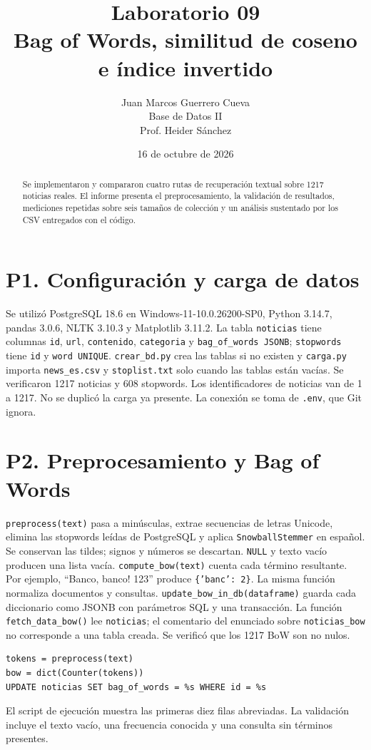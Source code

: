 \documentclass[11pt,a4paper]{article}
\title{Laboratorio 09\\Bag of Words, similitud de coseno e índice invertido}
\author{Juan Marcos Guerrero Cueva\\Base de Datos II\\Prof. Heider Sánchez}
\date{16 de octubre de 2026}
\newcommand{\codigo}[1]{\texttt{#1}}
\begin{document}
\maketitle
\begin{abstract}
Se implementaron y compararon cuatro rutas de recuperación textual sobre 1217
noticias reales. El informe presenta el preprocesamiento, la validación de resultados,
mediciones repetidas sobre seis tamaños de colección y un análisis sustentado por los CSV
entregados con el código.
\end{abstract}
\tableofcontents
\clearpage

\section{P1. Configuración y carga de datos}
Se utilizó PostgreSQL 18.6 en Windows-\allowbreak{}11-\allowbreak{}10.0.26200-\allowbreak{}SP0, Python 3.14.7, pandas
3.0.6, NLTK 3.10.3 y Matplotlib 3.11.2. La tabla
\codigo{noticias} tiene columnas \codigo{id}, \codigo{url}, \codigo{contenido},
\codigo{categoria} y \codigo{bag\_of\_words JSONB}; \codigo{stopwords} tiene
\codigo{id} y \codigo{word UNIQUE}. \codigo{crear\_bd.py} crea las tablas si no
existen y \codigo{carga.py} importa \codigo{news\_es.csv} y \codigo{stoplist.txt}
solo cuando las tablas están vacías. Se verificaron 1217 noticias y
608 stopwords. Los identificadores de noticias van de 1 a 1217. No se
duplicó la carga ya presente. La conexión se toma de \codigo{.env}, que Git ignora.

\section{P2. Preprocesamiento y Bag of Words}
\codigo{preprocess(text)} pasa a minúsculas, extrae secuencias de letras Unicode,
elimina las stopwords leídas de PostgreSQL y aplica \codigo{SnowballStemmer}
en español. Se conservan las tildes; signos y números se descartan. \codigo{NULL}
y texto vacío producen una lista vacía. \codigo{compute\_bow(text)} cuenta cada
término resultante. Por ejemplo, ``Banco, banco! 123'' produce
\codigo{\{'banc': 2\}}. La misma función normaliza documentos y consultas.
\codigo{update\_bow\_in\_db(dataframe)} guarda cada diccionario como JSONB
con parámetros SQL y una transacción. La función \codigo{fetch\_data\_bow()}
lee \codigo{noticias}; el comentario del enunciado sobre \codigo{noticias\_bow}
no corresponde a una tabla creada. Se verificó que los 1217 BoW son no nulos.
\begin{verbatim}
tokens = preprocess(text)
bow = dict(Counter(tokens))
UPDATE noticias SET bag_of_words = %s WHERE id = %s
\end{verbatim}
El script de ejecución muestra las primeras diez filas abreviadas. La validación
incluye el texto vacío, una frecuencia conocida y una consulta sin términos presentes.
\end{document}
